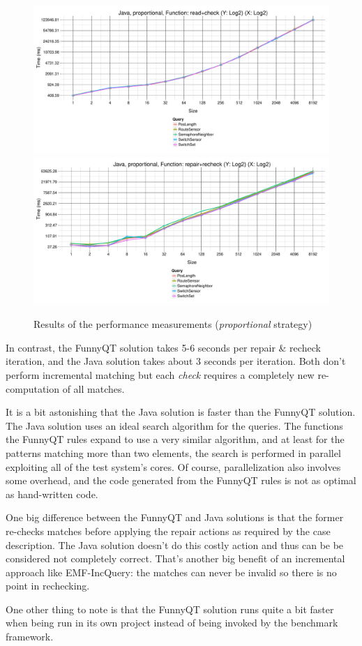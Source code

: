 \documentclass[submission]{eptcs}
\begin{document}
\begin{figure}[h!tb]
  \includegraphics[width=.495\textwidth]{perf/proportional-Java-GroupBy-Query-time-batch-validation}
  \includegraphics[width=.495\textwidth]{perf/proportional-Java-GroupBy-Query-time-revalidation}

  \caption{Results of the performance measurements (\emph{proportional} strategy)}
  \label{fig:performance-prop}
\end{figure}

In contrast, the FunnyQT solution takes 5-6 seconds per repair \& recheck
iteration, and the Java solution takes about 3 seconds per iteration.  Both
don't perform incremental matching but each \emph{check} requires a completely
new re-computation of all matches.

It is a bit astonishing that the Java solution is faster than the FunnyQT
solution.  The Java solution uses an ideal search algorithm for the queries.
The functions the FunnyQT rules expand to use a very similar algorithm, and at
least for the patterns matching more than two elements, the search is performed
in parallel exploiting all of the test system's cores.  Of course,
parallelization also involves some overhead, and the code generated from the
FunnyQT rules is not as optimal as hand-written code.

One big difference between the FunnyQT and Java solutions is that the former
re-checks matches before applying the repair actions as required by the case
description.  The Java solution doesn't do this costly action and thus can be
be considered not completely correct.  That's another big benefit of an
incremental approach like EMF-IncQuery: the matches can never be invalid so
there is no point in rechecking.

One other thing to note is that the FunnyQT solution runs quite a bit faster
when being run in its own project instead of being invoked by the benchmark
framework.





\end{document}
